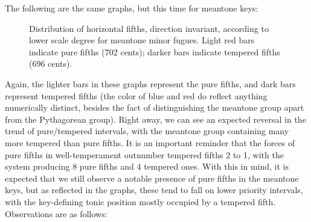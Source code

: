 The following are the same graphs, but this time for meantone keys:



\begin{figure}[H]
\vspace{1.5em}
    \centering
    \caption[Distribution of horizontal fifths, direction invariant, according to lower scale degree for meantone minor fugues. ]{Distribution of horizontal fifths, direction invariant, according to lower scale degree for meantone minor fugues. Light red bars indicate pure fifths (702 cents); darker bars indicate tempered fifths (696 cents).}
\end{figure}    Again, the lighter bars in these graphs represent the pure fifths, and
dark bars represent tempered fifths (the color of blue and red do
reflect anything numerically distinct, besides the fact of
distinguishing the meantone group apart from the Pythagorean group).
Right away, we can see an expected reversal in the trend of
pure/tempered intervals, with the meantone group containing many more
tempered than pure fifths. It is an important reminder that the forces
of pure fifths in well-temperament outnumber tempered fifths 2 to 1,
with the system producing 8 pure fifths and 4 tempered ones. With this
in mind, it is expected that we still observe a notable presence of pure
fifths in the meantone keys, but as reflected in the graphs, these tend
to fall on lower priority intervals, with the key-defining tonic
position mostly occupied by a tempered fifth. Observations are as
follows:


